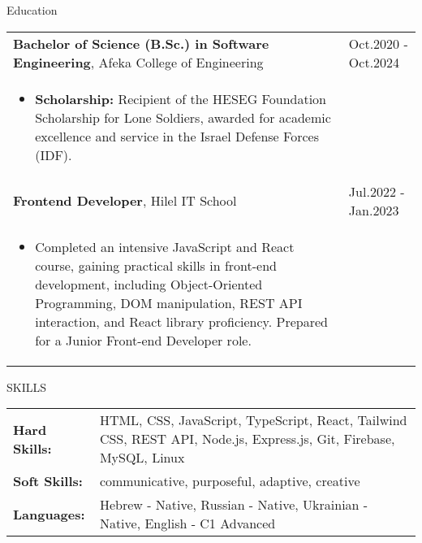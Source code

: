 \documentclass{resume}
\begin{document}
\vspace{15pt}
\begin{rSection}{Education}

\begin{tabular}{@{}p{}p{}}
  {\bf Bachelor of Science (B.Sc.) in Software Engineering}, Afeka College of Engineering & \hfill Oct.2020 - Oct.2024\hspace*{1em} \\
  \begin{itemize}
      \item \textbf{Scholarship:} Recipient of the HESEG Foundation Scholarship for Lone Soldiers, awarded for academic excellence and service in the Israel Defense Forces (IDF).
  \end{itemize}
  & \hfill \\
  {\bf Frontend Developer}, Hilel IT School & \hfill Jul.2022 - Jan.2023\hspace*{1em} \\
  \begin{itemize}
      \item Completed an intensive JavaScript and React course, gaining practical skills in front-end development, including Object-Oriented Programming, DOM manipulation, REST API interaction, and React library proficiency. Prepared for a Junior Front-end Developer role.
  \end{itemize}
\end{tabular}
\end{rSection}

\begin{rSection}{SKILLS}
\begin{tabularx}{\textwidth}{@{}>{\textbullet\hspace{\labelsep}\bfseries}l X@{}}
\vspace{0.5em}
\hspace{\labelsep}Hard Skills: & HTML, CSS, JavaScript, TypeScript, React, Tailwind CSS, REST API, Node.js, Express.js, Git, Firebase, MySQL,  Linux \\
\vspace{0.5em}
\hspace{\labelsep}Soft Skills: & communicative, purposeful, adaptive, creative\\
\vspace{0.5em}
\hspace{\labelsep}Languages: & Hebrew - Native, Russian - Native, Ukrainian - Native, English - C1 Advanced
\end{tabularx}
\end{rSection}
\end{document}
